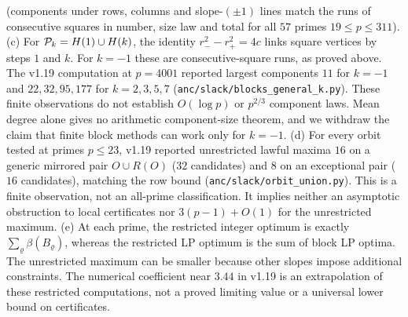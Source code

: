 \begin{remark}
(components under rows, columns and slope-$(\pm1)$ lines match the runs of consecutive squares in number, size
law and total for all $57$ primes $19\le p\le311$).
(c) For $\mathcal{P}_k=H(1)\cup H(k)$, the identity $r_-^2-r_+^2=4c$ links square vertices by steps $1$ and $k$.
For $k=-1$ these are consecutive-square runs, as proved above.  The v1.19 computation at $p=4001$ reported largest components
$11$ for $k=-1$ and $22,32,95,177$ for $k=2,3,5,7$ (\texttt{anc/slack/blocks\_general\_k.py}).
These finite observations do not establish $O(\log p)$ or $p^{2/3}$ component laws.  Mean degree alone gives no arithmetic component-size theorem,
and we withdraw the claim that finite block methods can work only for $k=-1$.
(d) For every orbit tested at primes $p\le23$, v1.19 reported unrestricted lawful maxima $16$ on a generic mirrored pair
$O\cup R(O)$ ($32$ candidates) and $8$ on an exceptional pair ($16$ candidates), matching the row bound
(\texttt{anc/slack/orbit\_union.py}).  This is a finite observation, not an all-prime classification.
It implies neither an asymptotic obstruction to local certificates nor $3(p-1)+O(1)$ for the unrestricted maximum.
(e) At each prime, the restricted integer optimum is exactly $\sum_\varrho\beta(B_\varrho)$, whereas the restricted LP optimum is the sum of block LP optima.
The unrestricted maximum can be smaller because other slopes impose additional constraints.  The numerical coefficient near $3.44$ in v1.19
is an extrapolation of these restricted computations, not a proved limiting value or a universal lower bound on certificates.
\end{remark}

